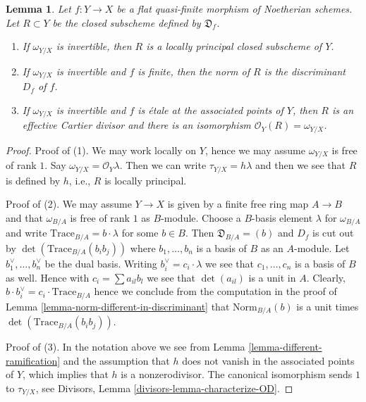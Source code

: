 \documentclass[10pt,a4paper]{amsart}
\theoremstyle{plain}
\newtheorem{lemma}[subsection]{Lemma}
\theoremstyle{definition}
\theoremstyle{remark}
\numberwithin{equation}{subsection}
\begin{document}
\begin{lemma}
\label{lemma-norm-different-is-discriminant}
Let $f : Y \to X$ be a flat quasi-finite morphism of Noetherian schemes.
Let $R \subset Y$ be the closed subscheme defined by $\mathfrak{D}_f$.
\begin{enumerate}
\item If $\omega_{Y/X}$ is invertible,
then $R$ is a locally principal closed subscheme of $Y$.
\item If $\omega_{Y/X}$ is invertible and $f$ is finite, then
the norm of $R$ is the discriminant $D_f$ of $f$.
\item If $\omega_{Y/X}$ is invertible and $f$
is \'etale at the associated points of $Y$, then $R$
is an effective Cartier divisor and there is an
isomorphism $\mathcal{O}_Y(R) = \omega_{Y/X}$.
\end{enumerate}
\end{lemma}

\begin{proof}
Proof of (1). We may work locally on $Y$, hence we may assume
$\omega_{Y/X}$ is free of rank $1$. Say $\omega_{Y/X} = \mathcal{O}_Y\lambda$.
Then we can write $\tau_{Y/X} = h \lambda$ and then we see that
$R$ is defined by $h$, i.e., $R$ is locally principal.

\medskip\noindent
Proof of (2). We may assume $Y \to X$ is given by a finite free ring
map $A \to B$ and that $\omega_{B/A}$ is free of rank $1$ as $B$-module.
Choose a $B$-basis element $\lambda$ for $\omega_{B/A}$ and write
$\text{Trace}_{B/A} = b \cdot \lambda$ for some $b \in B$.
Then $\mathfrak{D}_{B/A} = (b)$ and $D_f$ is cut out by
$\det(\text{Trace}_{B/A}(b_ib_j))$ where $b_1, \ldots, b_n$ is a
basis of $B$ as an $A$-module. Let $b_1^\vee, \ldots, b_n^\vee$
be the dual basis.
Writing $b_i^\vee = c_i \cdot \lambda$ we see that
$c_1, \ldots, c_n$ is a basis of $B$ as well.
Hence with $c_i = \sum a_{il}b_l$ we see that $\det(a_{il})$
is a unit in $A$. Clearly,
$b \cdot b_i^\vee = c_i \cdot \text{Trace}_{B/A}$
hence we conclude from the computation in the proof of
Lemma \ref{lemma-norm-different-in-discriminant}
that $\text{Norm}_{B/A}(b)$ is a unit times
$\det(\text{Trace}_{B/A}(b_ib_j))$.

\medskip\noindent
Proof of (3). In the notation above we see from
Lemma \ref{lemma-different-ramification} and the assumption
that $h$ does not vanish in
the associated points of $Y$, which implies that $h$ is a nonzerodivisor.
The canonical isomorphism sends $1$ to $\tau_{Y/X}$, see
Divisors, Lemma \ref{divisors-lemma-characterize-OD}.
\end{proof}
\end{document}
